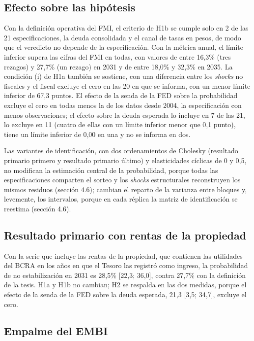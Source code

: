 \subsection{Efecto sobre las hipótesis}

Con la definición operativa del FMI, el criterio de H1b se cumple solo
en 2 de las 21 especificaciones, la deuda consolidada y el canal de
tasas en pesos, de modo que el veredicto no depende de la
especificación. Con la métrica anual, el límite inferior supera las
cifras del FMI en todas, con valores de entre 16,3\% (tres rezagos) y
27,7\% (un rezago) en 2031 y de entre 18,0\% y 32,3\% en 2035. La
condición (i) de H1a también se sostiene, con una diferencia entre los
\emph{shocks} no fiscales y el fiscal excluye el cero en las 20 en que
se informa, con un menor límite inferior de 67,3 puntos. El efecto de la
senda de la FED sobre la probabilidad excluye el cero en todas menos la
de los datos desde 2004, la especificación con menos observaciones; el
efecto sobre la deuda esperada lo incluye en 7 de las 21, lo excluye en
11 (cuatro de ellas con un límite inferior menor que 0,1 punto), tiene
un límite inferior de 0,00 en una y no se informa en dos.

Las variantes de identificación, con dos ordenamientos de Cholesky
(resultado primario primero y resultado primario último) y elasticidades
cíclicas de 0 y 0,5, no modifican la estimación central de la
probabilidad, porque todas las especificaciones comparten el sorteo y
los \emph{shocks} estructurales reconstruyen los mismos residuos
(sección 4.6); cambian el reparto de la varianza entre bloques y,
levemente, los intervalos, porque en cada réplica la matriz de
identificación se reestima (sección 4.6).

\subsection{Resultado primario con rentas de la propiedad}

Con la serie que incluye las rentas de la propiedad, que contienen las
utilidades del BCRA en los años en que el Tesoro las registró como
ingreso, la probabilidad de no estabilización en 2031 es 28,5\% {[}22,3;
36,0{]}, contra 27,7\% con la definición de la tesis. H1a y H1b no
cambian; H2 se respalda en las dos medidas, porque el efecto de la senda
de la FED sobre la deuda esperada, 21,3 {[}3,5; 34,7{]}, excluye el
cero.

\subsection{Empalme del EMBI}

